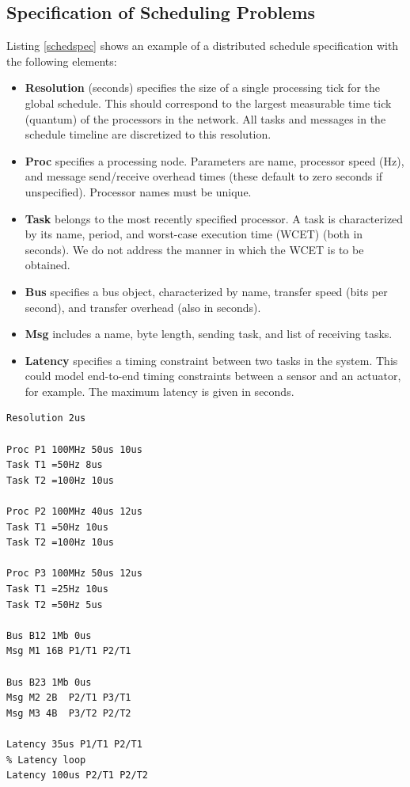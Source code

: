 \subsection{Specification of Scheduling Problems}


Listing \ref{schedspec} shows an example of a distributed schedule specification with the following elements:

\begin{itemize}
\item {\bf Resolution} (seconds) specifies the size of a single processing tick for the global schedule.  This should correspond to the largest measurable time tick (quantum) of the processors in the network.  All tasks and messages in the schedule timeline are discretized to this resolution.
\item {\bf Proc} specifies a processing node.  Parameters are name, processor speed (Hz), and message send/receive overhead times (these default to zero seconds if unspecified).  Processor names must be unique.
\item {\bf Task} belongs to the most recently specified processor.  A task is characterized by its name, period, and worst-case execution time (WCET) (both in seconds).  We do not address the manner in which the WCET is to be obtained.
\item {\bf Bus} specifies a bus object, characterized by name, transfer speed (bits per second), and transfer overhead (also in seconds).
\item {\bf Msg} includes a name, byte length, sending task, and list of receiving tasks.
\item {\bf Latency} specifies a timing constraint between two tasks in the system.  This could model end-to-end timing constraints between a sensor and an actuator, for example.  The maximum latency is given in seconds.
\end{itemize}

\begin{framed}
\lstset{basicstyle=\small,frame=none,label=schedspec,caption=Scheduling problem specification.}

\begin{lstlisting}
Resolution 2us

Proc P1 100MHz 50us 10us
Task T1 =50Hz 8us
Task T2 =100Hz 10us

Proc P2 100MHz 40us 12us
Task T1 =50Hz 10us
Task T2 =100Hz 10us

Proc P3 100MHz 50us 12us
Task T1 =25Hz 10us
Task T2 =50Hz 5us

Bus B12 1Mb 0us
Msg M1 16B P1/T1 P2/T1

Bus B23 1Mb 0us
Msg M2 2B  P2/T1 P3/T1
Msg M3 4B  P3/T2 P2/T2

Latency 35us P1/T1 P2/T1
% Latency loop
Latency 100us P2/T1 P2/T2
\end{lstlisting}
\end{framed}


